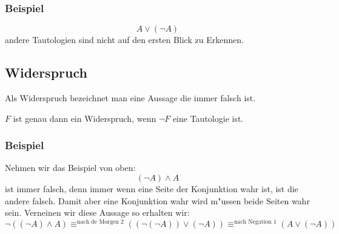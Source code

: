 \subsubsection*{Beispiel}
\begin{equation*}
A \lor (\neg A)
\end{equation*}
andere Tautologien sind nicht auf den ersten Blick zu Erkennen.

\subsection{Widerspruch}
Als Widerspruch bezeichnet man eine Aussage die immer falsch ist. 
\begin{axiom}[Widerspruch]
$F$ ist genau dann ein Widerspruch, wenn $\neg F$ eine Tautologie ist.
\end{axiom}

\subsubsection*{Beispiel}
Nehmen wir das Beispiel von oben:
\begin{equation*}
(\neg A) \land A
\end{equation*}
ist immer falsch, denn immer wenn eine Seite der Konjunktion wahr ist, ist die andere falsch. Damit aber eine Konjunktion wahr wird m"ussen beide Seiten wahr sein. Verneinen wir diese Aussage so erhalten wir:
\begin{equation*}
\neg ((\neg A) \land A) \equiv^{\text{nach de Morgen 2}} ((\neg (\neg A)) \lor (\neg A)) \equiv^{\text{nach Negation 1}} (A \lor (\neg A))
\end{equation*} 


